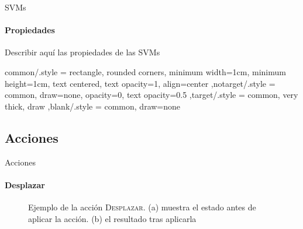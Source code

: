 \documentclass[utf8]{beamer}
\begin{document}
  \begin{frame}{SVMs}
    \framesubtitle{Propiedades}
    Describir aquí las propiedades de las SVMs
  \end{frame}
  
\tikzset
  {common/.style =
    {rectangle, rounded corners, minimum width=1cm, minimum height=1cm,
     text centered, text opacity=1, align=center
    }
  ,notarget/.style = {common, draw=none, opacity=0, text opacity=0.5}
  ,target/.style   = {common, very thick, draw}
  ,blank/.style    = {common, draw=none}
  }

  \subsection{Acciones}
  
  \begin{frame}[label=acciones]{Acciones}
    \framesubtitle{Desplazar}
    \begin{figure}[ht]
  \begin{subfigure}[b]{0.43\textwidth}
    \caption{}
  \end{subfigure}
  \qquad
  \begin{subfigure}[b]{0.3\textwidth}
    \caption{}
  \end{subfigure}
  \caption{Ejemplo de la acción \textsc{Desplazar}. (a) muestra el
    estado antes de aplicar la acción. (b) el resultado tras
    aplicarla}
  
\end{figure}
\end{frame}
\end{document}
